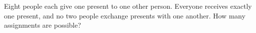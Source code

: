 Eight people each give one present to one other person. Everyone receives exactly one present, and no two people exchange presents with one another. How many assignments are possible?
